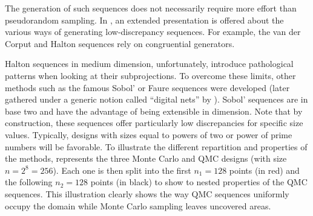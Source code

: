
The generation of such sequences does not necessarily require more effort than pseudorandom sampling. 
In \citet[Chap. 15]{owen_2013}, an extended presentation is offered about the various ways of generating low-discrepancy sequences. 
For example, the van der Corput and Halton sequences rely on congruential generators. 

Halton sequences in medium dimension, unfortunately, introduce pathological patterns when looking at their subprojections. 
To overcome these limits, other methods such as the famous Sobol' or Faure sequences were developed (later gathered under a generic notion called ``digital nets'' by \citealp{dick_2010_digital_nets}).  
Sobol' sequences are in base two and have the advantage of being extensible in dimension. 
Note that by construction, these sequences offer particularly low discrepancies for specific size values. 
Typically, designs with sizes equal to powers of two or power of prime numbers will be favorable. 
To illustrate the different repartition and properties of the methods,  represents the three Monte Carlo and QMC designs (with size $n=2^8=256$). 
Each one is then split into the first $n_1=128$ points (in red) and the following $n_2=128$ points (in black) to show to nested properties of the QMC sequences. 
This illustration clearly shows the way QMC sequences uniformly occupy the domain while Monte Carlo sampling leaves uncovered areas.  

